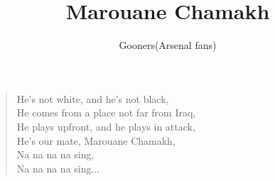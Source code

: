 \documentclass[a4paper,12pt]{article}
\title{Marouane Chamakh}
\author{Gooners(Arsenal fans)}
\date{}
\begin{document}
	
	\maketitle
	
	\begin{verse}
		
		He's not white, and he's not black, \\
		He comes from a place not far from Iraq, \\
		He plays upfront, and he plays in attack, \\
		He's our mate, Marouane Chamakh, \\
		Na na na na sing, \\
		Na na na na﻿ sing$\ldots$
		
	\end{verse}
	
\end{document}
